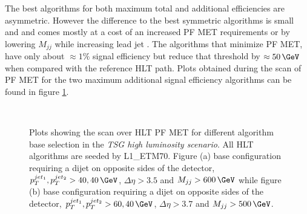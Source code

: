 The best algorithms for both maximum total and additional efficiencies are asymmetric. However the difference to the best symmetric algorithms is small and and comes mostly at a cost of an increased \gls{PF} \gls{MET} requirements or by lowering $M_{jj}$ while increasing lead jet \pt. The algorithms that minimize \gls{PF} \gls{MET}, have only about $\approx 1\%$ signal efficiency but reduce that threshold by $\approx 50\,\GeV$ when compared with the reference \gls{HLT} path. Plots obtained during the scan of \gls{PF} \gls{MET} for the two maximum additional signal efficiency algorithms can be found in figure \ref{FIGURE:RunIIPreparation_HLT_Seed_L1TETM70}.

\begin{figure}[!htp]
\centering
{}\qquad
{}\\
\caption{Plots showing the scan over \gls{HLT} \gls{PF} \gls{MET} for different algorithm base selection in the \textit{\gls{TSG} high luminosity scenario}. All \gls{HLT} algorithms are seeded by L1\_ETM70. Figure (a) base configuration requiring a dijet on opposite sides of the detector, $p_T^{jet_1},p_T^{jet_2}>40,40\,\GeV$, $\Delta\eta>3.5$ and $M_{jj}>600\,\GeV$ while figure (b) base configuration requiring a dijet on opposite sides of the detector, $p_T^{jet_1},p_T^{jet_2}>60,40\,\GeV$, $\Delta\eta>3.7$ and $M_{jj}>500\,\GeV$.}
\label{FIGURE:RunIIPreparation_HLT_Seed_L1TETM70}
\end{figure}

